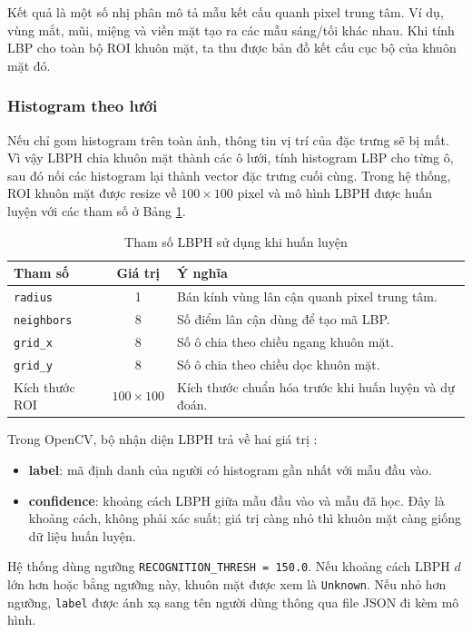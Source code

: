 Kết quả là một số nhị phân mô tả mẫu kết cấu quanh pixel trung tâm. Ví dụ, vùng mắt, mũi, miệng và viền mặt tạo ra các mẫu sáng/tối khác nhau. Khi tính LBP cho toàn bộ ROI khuôn mặt, ta thu được bản đồ kết cấu cục bộ của khuôn mặt đó.

\subsubsection{Histogram theo lưới}

Nếu chỉ gom histogram trên toàn ảnh, thông tin vị trí của đặc trưng sẽ bị mất. Vì vậy LBPH chia khuôn mặt thành các ô lưới, tính histogram LBP cho từng ô, sau đó nối các histogram lại thành vector đặc trưng cuối cùng. Trong hệ thống, ROI khuôn mặt được resize về $100\times100$ pixel và mô hình LBPH được huấn luyện với các tham số ở Bảng \ref{tab:lbph_params}.

\begin{table}[H]
\centering
\caption{Tham số LBPH sử dụng khi huấn luyện}
\label{tab:lbph_params}
\begin{tabular}{|l|c|p{7.5cm}|}
\hline
\textbf{Tham số} & \textbf{Giá trị} & \textbf{Ý nghĩa} \\
\hline
\texttt{radius} & 1 & Bán kính vùng lân cận quanh pixel trung tâm. \\
\hline
\texttt{neighbors} & 8 & Số điểm lân cận dùng để tạo mã LBP. \\
\hline
\texttt{grid\_x} & 8 & Số ô chia theo chiều ngang khuôn mặt. \\
\hline
\texttt{grid\_y} & 8 & Số ô chia theo chiều dọc khuôn mặt. \\
\hline
Kích thước ROI & $100\times100$ & Kích thước chuẩn hóa trước khi huấn luyện và dự đoán. \\
\hline
\end{tabular}
\end{table}

Trong OpenCV, bộ nhận diện LBPH trả về hai giá trị \cite{opencv}:

\begin{itemize}
    \item \textbf{label}: mã định danh của người có histogram gần nhất với mẫu đầu vào.
    \item \textbf{confidence}: khoảng cách LBPH giữa mẫu đầu vào và mẫu đã học. Đây là khoảng cách, không phải xác suất; giá trị càng nhỏ thì khuôn mặt càng giống dữ liệu huấn luyện.
\end{itemize}

Hệ thống dùng ngưỡng \texttt{RECOGNITION\_THRESH = 150.0}. Nếu khoảng cách LBPH $d$ lớn hơn hoặc bằng ngưỡng này, khuôn mặt được xem là \texttt{Unknown}. Nếu nhỏ hơn ngưỡng, \texttt{label} được ánh xạ sang tên người dùng thông qua file JSON đi kèm mô hình.

